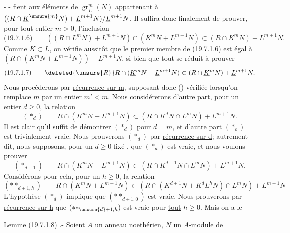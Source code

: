 -  -
fient aux éléments de $\operatorname{gr}_{\underline L}^m(N)$ appartenant à
$((R\cap\underline K^{\unsure{m}}N)+\underline L^{m+1}N)/\underline L^{m+1}N$. Il
suffira donc finalement de prouver, pour tout entier $m>0$, l'inclusion
\[
\text{(19.7.1.6)}\qquad
((R\cap\underline L^mN)+\underline L^{m+1}N)
 \cap(\underline K^mN+\underline L^{m+1}N)
 \subset(R\cap\underline K^mN)+\underline L^{m+1}N.
\]
Comme $\underline K\subset\underline L$, on vérifie aussitôt que le premier membre de (19.7.1.6)
est égal à $(R\cap(\underline K^mN+\underline L^{m+1}N))+\underline L^{m+1}N$,
si bien que tout se réduit à prouver
\[
\text{(19.7.1.7)}\qquad
\deleted{\unsure{R}}
R\cap(\underline K^mN+\underline L^{m+1}N)
 \subset(R\cap\underline K^mN)+\underline L^{m+1}N.
\]
Nous procéderons par \uline{récurrence sur m}, supposant donc () vérifiée
lorsqu'on remplace $m$ par un entier $m'<m$. Nous considérerons d'autre part,
pour  un entier $d\geq0$, la relation
\[
(*_d)\qquad
R\cap(\underline K^mN+\underline L^{m+1}N)
 \subset(R\cap\underline K^dN\cap\underline L^mN)+\underline L^{m+1}N.
\]
 Il est clair qu'il suffit de démontrer $(*_d)$ pour $d=m$, et d'autre
part $(*_o)$ est trivialement vraie. Nous prouverons $(*_d)$ par \uline{récurrence sur d};
autrement dit, nous supposons, pour un $d\geq0$ fixé , que $(*_d)$
est vraie, et nous voulons prouver
\[
(*_{d+1})\qquad
R\cap(\underline K^mN+\underline L^{m+1}N)
 \subset(R\cap\underline K^{d+1}N\cap\underline L^mN)+\underline L^{m+1}N.
\]
Considérons pour cela, pour un $h\geq0$, la relation
\[
(**_{d+1,h})\qquad
R\cap(\underline K^mN+\underline L^{m+1}N)
 \subset(R\cap(\underline K^{d+1}N+\underline K^d\underline L^hN)
 \cap\underline L^mN)+\underline L^{m+1}N
\]
L'hypothèse $(*_d)$ implique que $(**_{d+1,0})$ est vraie. Nous prouverons
par \uline{récurrence sur h} que $(**_{\unsure{d}+1,h})$ est vraie pour \uline{tout} $h\geq0$.
Mais 
on a le

\uline{Lemme} (19.7.1.8) .- \uline{Soient} $A$ \uline{un anneau noethérien}, $N$ \uline{un} $A$-\uline{module de}
